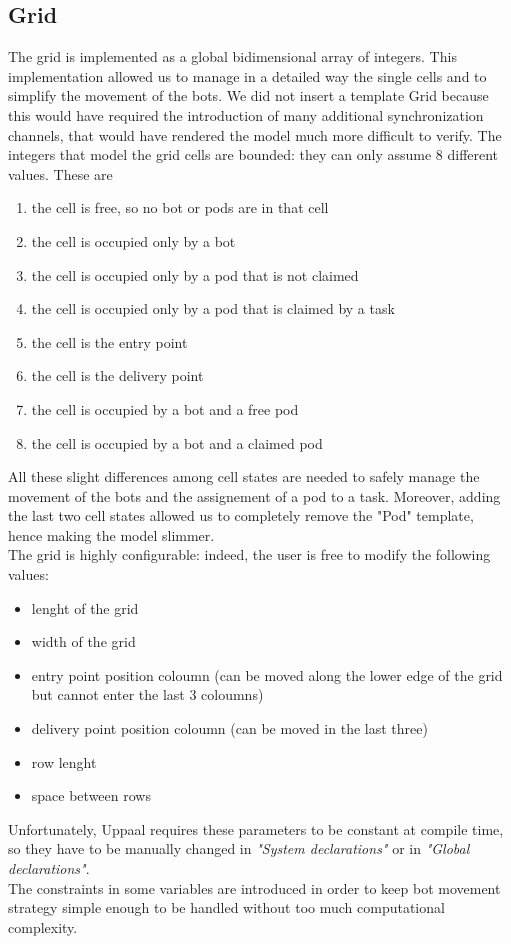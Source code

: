 \documentclass{article}
\begin{document}
		\subsection{Grid}
			The grid is implemented as a global bidimensional array of integers. This implementation allowed us to manage in a detailed way the single cells and to simplify the movement of the bots. We did not insert a template Grid because this would have required the introduction of many additional synchronization channels, that would have rendered the model much more difficult to verify.
			The integers that model the grid cells are bounded: they can only assume 8 different values. These are
			\begin{enumerate}[start=0, label={\arabic* :}]
				\item the cell is free, so no bot or pods are in that cell
				\item the cell is occupied only by a bot
				\item the cell is occupied only by a pod that is not claimed
				\item the cell is occupied only by a pod that is claimed by a task 
				\item the cell is the entry point 
				\item the cell is the delivery point
				\item the cell is occupied by a bot and a free pod
				\item the cell is occupied by a bot and a claimed pod
			\end{enumerate}
			All these slight differences among cell states are needed to safely manage the movement of the bots and the assignement of a pod to a task. Moreover, adding the last two cell states allowed us to completely remove the "Pod" template, hence making the model slimmer.\\
			The grid is highly configurable: indeed, the user is free to modify the following values:
			\begin{itemize}
				\item lenght of the grid
				\item width of the grid
				\item entry point position coloumn (can be moved along the lower edge of the grid but cannot enter the last 3 coloumns) 
				\item delivery point position coloumn (can be moved in the last three)
				\item row lenght
				\item space between rows
			\end{itemize}
			Unfortunately, Uppaal requires these parameters to be constant at compile time, so they have to be manually changed in \emph{"System declarations"} or in \emph{"Global declarations"}.\\
			The constraints in some variables are introduced in order to keep bot movement strategy simple enough to be handled without too much computational complexity.
			
\end{document}
